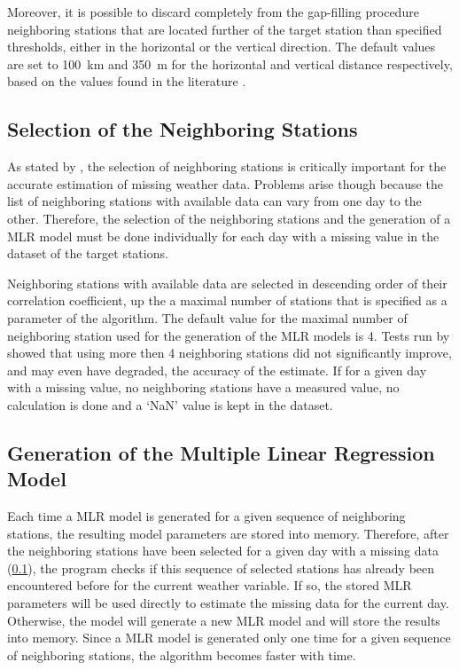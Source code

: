 \documentclass[TechnicalNoteMeteo.tex]{subfiles}
\begin{document}
Moreover, it is possible to discard completely from the gap-filling procedure neighboring stations that are located further of the target station than specified thresholds, either in the horizontal or the vertical direction. The default values are set to \SI{100}{km} and \SI{350}{m} for the horizontal and vertical distance respectively, based on the values found in the literature \cite{tronci_comparison_1986,xia_forest_1999,simolo_improving_2010}.

\subsection{Selection of the Neighboring Stations}\label{sec:select_stations}

As stated by \cite{eischeid_creating_2000}, the selection of neighboring stations is critically important for the accurate estimation of missing weather data. Problems arise though because the list of neighboring stations with available data can vary from one day to the other. Therefore, the selection of the neighboring stations and the generation of a MLR model must be done individually for each day with a missing value in the dataset of the target stations.

Neighboring stations with available data are selected in descending order of their correlation coefficient, up the a maximal number of stations that is specified as a parameter of the algorithm. The default value for the maximal number of neighboring station used for the generation of the MLR models is 4. Tests run by \cite{eischeid_creating_2000} showed that using more then 4 neighboring stations did not significantly improve, and may even have degraded, the accuracy of the estimate. If for a given day with a missing value, no neighboring stations have a measured value, no calculation is done and a ‘NaN' value is kept in the dataset. 

\subsection{Generation of the Multiple Linear Regression Model}

Each time a MLR model is generated for a given sequence of neighboring stations, the resulting model parameters are stored into memory. Therefore, after the neighboring stations have been selected for a given day with a missing data (\cref{sec:select_stations}), the program checks if this sequence of selected stations has already been encountered before for the current weather variable. If so, the stored MLR parameters will be used directly to estimate the missing data for the current day. Otherwise, the model will generate a new MLR model and will store the results into memory. Since a MLR model is generated only one time for a given sequence of neighboring stations, the algorithm becomes faster with time.
\end{document}
